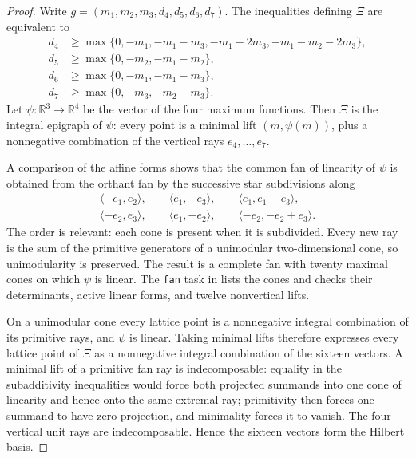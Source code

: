 \documentclass[11pt,reqno]{amsart}
\numberwithin{equation}{section}
\theoremstyle{remark}
\newcommand{\RR}{\mathbb{R}}
\begin{document}
\begin{proof}
Write $g=(m_1,m_2,m_3,d_4,d_5,d_6,d_7)$.  The inequalities defining
$\Xi$ are equivalent to
\[
 \begin{aligned}
 d_4&\ge\max\{0,-m_1,-m_1-m_3,-m_1-2m_3,
                    -m_1-m_2-2m_3\},\\
 d_5&\ge\max\{0,-m_2,-m_1-m_2\},\\
 d_6&\ge\max\{0,-m_1,-m_1-m_3\},\\
 d_7&\ge\max\{0,-m_3,-m_2-m_3\}.
 \end{aligned}
\]
Let $\psi\colon\RR^3\to\RR^4$ be the vector of the four maximum
functions.  Then $\Xi$ is the integral epigraph of $\psi$: every point
is a minimal lift $(m,\psi(m))$, plus a nonnegative combination of the
vertical rays $e_4,\ldots,e_7$.

A comparison of the affine forms shows that the common fan of linearity of
$\psi$ is obtained from the orthant fan by the successive star
subdivisions along
\[
 \begin{gathered}
 \langle-e_1,e_2\rangle,\qquad
 \langle e_1,-e_3\rangle,\qquad
 \langle e_1,e_1-e_3\rangle,\\
 \langle-e_2,e_3\rangle,\qquad
 \langle e_1,-e_2\rangle,\qquad
 \langle-e_2,-e_2+e_3\rangle.
 \end{gathered}
\]
The order is relevant: each cone is present when it is subdivided.
Every new ray is the sum of the primitive generators of a unimodular
two-dimensional cone, so unimodularity is preserved.  The result is a complete
fan with twenty maximal cones on which $\psi$ is linear.  The \texttt{fan}
task in  lists the cones and checks their
determinants, active linear forms, and twelve nonvertical lifts.

On a unimodular cone every lattice point is a nonnegative integral
combination of its primitive rays, and $\psi$ is linear.  Taking minimal
lifts therefore expresses every lattice point of $\Xi$ as a nonnegative
integral combination of the sixteen vectors.  A minimal lift of a
primitive fan ray is indecomposable: equality in the subadditivity
inequalities would force both projected summands into one cone of linearity
and hence onto the same extremal ray; primitivity then forces one summand to
have zero projection, and minimality forces it to vanish.  The four vertical
unit rays are indecomposable.  Hence the sixteen vectors form the
Hilbert basis.
\end{proof}
\end{document}
